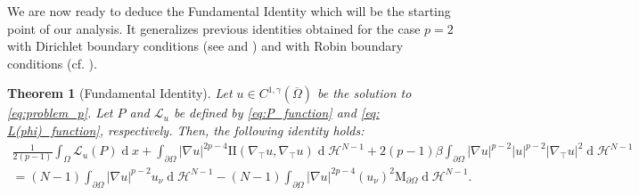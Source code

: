 \documentclass[10pt,a4paper]{amsart}
\numberwithin{equation}{section}
\newtheorem{teo}{Theorem}[section]
\renewcommand{\d}[1]{\ensuremath{\operatorname{d}\!{#1}}}
\begin{document}
We are now ready to deduce the Fundamental Identity which will be the starting point of our analysis. It generalizes previous identities obtained for the case $p=2$ with Dirichlet boundary conditions (see \cite[Thm. 2.1]{mapo19} and \cite[Thm. 2.4]{mp2020}) and with Robin boundary conditions (cf. \cite[Thm. 3]{gamo26}).  

\begin{teo}[Fundamental Identity] \label{teo:fundamental}
Let $u \in C^{1,\gamma}(\overline{\Omega})$ be the solution to \eqref{eq:problem_p}. Let $P$ and $\mathcal{L}_u$ be defined by \eqref{eq:P_function} and \eqref{eq: L(phi)_function}, respectively. Then, the following identity holds:
\begin{equation}\label{eq: fundamental identity}
    \begin{aligned}
    \frac{1}{2(p-1)}\int_\Omega \mathcal{L}_u(P) \d{x}+\int_{\partial\Omega} |\nabla u|^{2p-4} \mathrm{I\!I}(\nabla_\top u,\nabla_\top u) \d{}\mathcal{H}^{N-1}+ 2(p-1) \beta\int_{\partial\Omega} |\nabla u|^{p-2}|u|^{p-2}|\nabla_\top u|^2 \d{}\mathcal{H}^{N-1} \\= (N-1) \int_{\partial\Omega} |\nabla u|^{p-2} u_\nu \d{}\mathcal{H}^{N-1}
    - (N-1) \int_{\partial\Omega} |\nabla u|^{2p-4} (u_\nu)^2 \mathrm{M}_{\partial\Omega} \d{}\mathcal{H}^{N-1}.
    \end{aligned}
\end{equation}
\end{teo}
\end{document}
